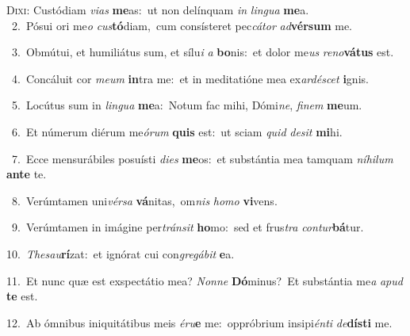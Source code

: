 \lettrine{\initial\textcolor{\initialcolor}{D}}{ixi:} Custódiam \textit{vi}\-\textit{as} \textbf{me}\-as:~\star ut non delínquam \textit{in} \textit{lin}\-\textit{gua} \textbf{me}\-a.\\
{\numbfont\textcolor{\numbcolor}{~2.}}~Pósui ori me\textit{o} \textit{cus}\-\textbf{tó}diam,~\star cum consísteret pec\-\textit{cá}\-\textit{tor} \textit{ad}\-\textbf{vér}\textbf{sum} me.\par
{\numbfont\textcolor{\numbcolor}{~3.}}~Obmútui, et humiliátus sum, et sílu\textit{i} \textit{a} \textbf{bo}\-nis:~\star et dolor me\textit{us} \textit{re}\-\textit{no}\textbf{vá}\textbf{tus} est.\par
{\numbfont\textcolor{\numbcolor}{~4.}}~Concáluit cor \textit{me}\-\textit{um} \textbf{in}\-tra me:~\star et in meditatióne mea ex\-\textit{ar}\-\textit{dé}\textit{scet} \textbf{i}\-gnis.\par
{\numbfont\textcolor{\numbcolor}{~5.}}~Locútus sum in \textit{lin}\-\textit{gua} \textbf{me}\-a:~\star Notum fac mihi, Dómi\-\textit{ne}\-, \textit{fi}\-\textit{nem} \textbf{me}\-um.\par
{\numbfont\textcolor{\numbcolor}{~6.}}~Et númerum diérum me\-\textit{ó}\-\textit{rum} \textbf{quis} est:~\star ut sciam \textit{quid} \textit{de}\-\textit{sit} \textbf{mi}\-hi.\par
{\numbfont\textcolor{\numbcolor}{~7.}}~Ecce mensurábiles posuísti \textit{di}\-\textit{es} \textbf{me}\-os:~\star et substántia mea tamquam \textit{ní}\-\textit{hi}\textit{lum} \textbf{an}\-\textbf{te} te.\par
{\numbfont\textcolor{\numbcolor}{~8.}}~Verúmtamen uni\-\textit{vér}\-\textit{sa} \textbf{vá}\-nitas,~\star om\textit{nis} \textit{ho}\-\textit{mo} \textbf{vi}\-vens.\par
{\numbfont\textcolor{\numbcolor}{~9.}}~Verúmtamen in imágine per\-\textit{tráns}\-\textit{it} \textbf{ho}\-mo:~\star sed et frus\textit{tra} \textit{con}\-\textit{tur}\textbf{bá}tur.\par
{\numbfont\textcolor{\numbcolor}{10.}}~\-\textit{The}\-\textit{sau}\textbf{rí}zat:~\star et ignórat cui con\-\textit{gre}\-\textit{gá}\textit{bit} \textbf{e}\-a.\par
{\numbfont\textcolor{\numbcolor}{11.}}~Et nunc quæ est exspectátio mea? \textit{Non}\-\textit{ne} \textbf{Dó}\-minus?~\star Et substántia me\textit{a} \textit{a}\-\textit{pud} \textbf{te} est.\par
{\numbfont\textcolor{\numbcolor}{12.}}~Ab ómnibus iniquitátibus meis \textit{é}\-\textit{ru}\textbf{e} me:~\star oppróbrium insipi\-\textit{én}\-\textit{ti} \textit{de}\-\textbf{dís}\textbf{ti} me.\par
